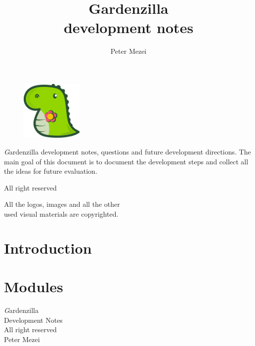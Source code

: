 \documentclass{article}
\author{Peter Mezei}
\title{Gardenzilla \\ development notes}
\begin{document}
\maketitle
\newpage
\thispagestyle{empty}
\begin{figure}
  \centering
  \includegraphics[width=3cm]{logo.png}
\end{figure}
\begin{center}
  {\textit  Gardenzilla development notes, questions and future development directions. The main goal of this document is to document the development steps and collect all the ideas for future evaluation.

    \vspace{1cm} All right reserved \the\year{}

    All the logos, images and all the other\\ used visual materials are copyrighted.
  }
\end{center}
\newpage
\thispagestyle{empty}
\tableofcontents
\newpage
\section{Introduction}
\newpage
\section{Modules}
\newpage
\thispagestyle{empty}
\vspace*{5cm}
\begin{center}
  {\textit Gardenzilla\\ Development Notes \\ \vspace{5mm} All right reserved \\ Peter Mezei \\\the\year{}}
\end{center}
\end{document}

